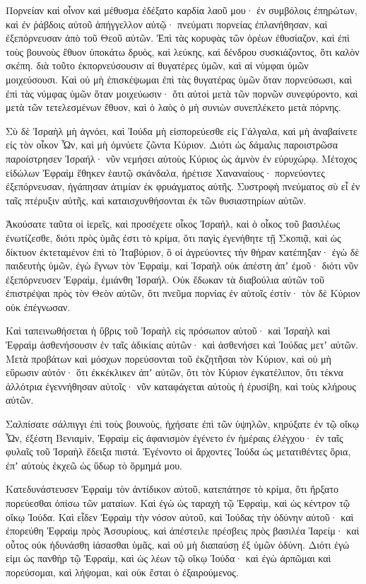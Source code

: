 \begin{spacing}{1.1}
\begin{multicols}{2}
Πορνείαν καὶ οἶνον καὶ μέθυσμα ἐδέξατο καρδία λαοῦ μου·
ἐν συμβόλοις ἐπηρώτων, καὶ ἐν ῥάβδοις αὐτοῦ ἀπήγγελλον αὐτῷ· πνεύματι πορνείας ἐπλανήθησαν, καὶ ἐξεπόρνευσαν ἀπὸ τοῦ Θεοῦ αὐτῶν.
Ἐπὶ τὰς κορυφὰς τῶν ὀρέων ἐθυσίαζον, καὶ ἐπὶ τοὺς βουνοὺς ἔθυον ὑποκάτω δρυὸς, καὶ λεύκης, καὶ δένδρου συσκιάζοντος, ὅτι καλὸν σκέπη. διὰ τοῦτο ἐκπορνεύσουσιν αἱ θυγατέρες ὑμῶν, καὶ αἱ νύμφαι ὑμῶν μοιχεύσουσι.
Καὶ οὐ μὴ ἐπισκέψωμαι ἐπὶ τὰς θυγατέρας ὑμῶν ὅταν πορνεύσωσι, καὶ ἐπὶ τὰς νύμφας ὑμῶν ὅταν μοιχεύωσιν· ὅτι αὐτοὶ μετὰ τῶν πορνῶν συνεφύροντο, καὶ μετὰ τῶν τετελεσμένων ἔθυον, καὶ ὁ λαὸς ὁ μὴ συνιὼν συνεπλέκετο μετὰ πόρνης.

Σὺ δὲ Ἰσραὴλ μὴ ἀγνόει, καὶ Ἰούδα μὴ εἰσπορεύεσθε εἰς Γάλγαλα, καὶ μὴ ἀναβαίνετε εἰς τὸν οἶκον Ὦν, καὶ μὴ ὀμνύετε ζῶντα Κύριον.
Διότι ὡς δάμαλις παροιστρῶσα παροίστρησεν Ἰσραήλ· νῦν νεμήσει αὐτοὺς Κύριος ὡς ἀμνὸν ἐν εὐρυχώρῳ.
Μέτοχος εἰδώλων Ἐφραὶμ ἔθηκεν ἑαυτῷ σκάνδαλα,
ἠρέτισε Χαναναίους· πορνεύοντες ἐξεπόρνευσαν, ἠγάπησαν ἀτιμίαν ἐκ φρυάγματος αὐτῆς.
Συστροφὴ πνεύματος σὺ εἶ ἐν ταῖς πτέρυξιν αὐτῆς, καὶ καταισχυνθήσονται ἐκ τῶν θυσιαστηρίων αὐτῶν.

Ἀκούσατε ταῦτα οἱ ἱερεῖς, καὶ προσέχετε οἶκος Ἰσραήλ, καὶ ὁ οἶκος τοῦ βασιλέως ἐνωτίζεσθε, διότι πρὸς ὑμᾶς ἐστι τὸ κρίμα, ὅτι παγὶς ἐγενήθητε τῇ Σκοπιᾷ, καὶ ὡς δίκτυον ἐκτεταμένον ἐπὶ τὸ Ἰταβύριον,
ὃ οἱ ἀγρεύοντες τὴν θήραν κατέπηξαν· ἐγὼ δὲ παιδευτὴς ὑμῶν,
ἐγὼ ἔγνων τὸν Ἐφραὶμ, καὶ Ἰσραὴλ οὐκ ἀπέστη ἀπʼ ἐμοῦ· διότι νῦν ἐξεπόρνευσεν Ἐφραὶμ, ἐμιάνθη Ἰσραήλ.
Οὐκ ἔδωκαν τὰ διαβούλια αὐτῶν τοῦ ἐπιστρέψαι πρὸς τὸν Θεὸν αὐτῶν, ὅτι πνεῦμα πορνίας ἐν αὐτοῖς ἐστίν· τὸν δὲ Κύριον οὐκ ἐπέγνωσαν.

Καὶ ταπεινωθήσεται ἡ ὕβρις τοῦ Ἰσραὴλ εἰς πρόσωπον αὐτοῦ· καὶ Ἰσραὴλ καὶ Ἐφραὶμ ἀσθενήσουσιν ἐν ταῖς ἀδικίαις αὐτῶν· καὶ ἀσθενήσει καὶ Ἰούδας μετʼ αὐτῶν.
Μετὰ προβάτων καὶ μόσχων πορεύσονται τοῦ ἐκζητῆσαι τὸν Κύριον, καὶ οὐ μὴ εὕρωσιν αὐτόν· ὅτι ἐκκέκλικεν ἀπʼ αὐτῶν,
ὅτι τὸν Κύριον ἐγκατέλιπον, ὅτι τέκνα ἀλλότρια ἐγεννήθησαν αὐτοῖς· νῦν καταφάγεται αὐτοὺς ἡ ἐρυσίβη, καὶ τοὺς κλήρους αὐτῶν.

Σαλπίσατε σάλπιγγι ἐπὶ τοὺς βουνοὺς, ἠχήσατε ἐπὶ τῶν ὑψηλῶν, κηρύξατε ἐν τῷ οἴκῳ Ὦν, ἐξέστη Βενιαμὶν,
Ἐφραὶμ εἰς ἀφανισμὸν ἐγένετο ἐν ἡμέραις ἐλέγχου· ἐν ταῖς φυλαῖς τοῦ Ἰσραὴλ ἔδειξα πιστά.
Ἐγένοντο οἱ ἄρχοντες Ἰούδα ὡς μετατιθέντες ὅρια, ἐπʼ αὐτοὺς ἐκχεῶ ὡς ὕδωρ τὸ ὅρμημά μου.

Κατεδυνάστευσεν Ἐφραὶμ τὸν ἀντίδικον αὐτοῦ, κατεπάτησε τὸ κρίμα, ὅτι ἤρξατο πορεύεσθαι ὀπίσω τῶν ματαίων.
Καὶ ἐγὼ ὡς ταραχὴ τῷ Ἐφραὶμ, καὶ ὡς κέντρον τῷ οἴκῳ Ἰούδα.
Καὶ εἶδεν Ἐφραὶμ τὴν νόσον αὐτοῦ, καὶ Ἰούδας τὴν ὀδύνην αὐτοῦ· καὶ ἐπορεύθη Ἐφραὶμ πρὸς Ἀσσυρίους, καὶ ἀπέστειλε πρέσβεις πρὸς βασιλέα Ἰαρείμ· καὶ οὗτος οὐκ ἠδυνάσθη ἰάσασθαι ὑμᾶς, καὶ οὐ μὴ διαπαύσῃ ἐξ ὑμῶν ὀδύνη.
Διότι ἐγώ εἰμι ὡς πανθὴρ τῷ Ἐφραὶμ, καὶ ὡς λέων τῷ οἴκῳ Ἰούδα· καὶ ἐγὼ ἁρπῶμαι καὶ πορεύσομαι, καὶ λήψομαι, καὶ οὐκ ἔσται ὁ ἐξαιρούμενος.


\end{multicols}
\end{spacing}
